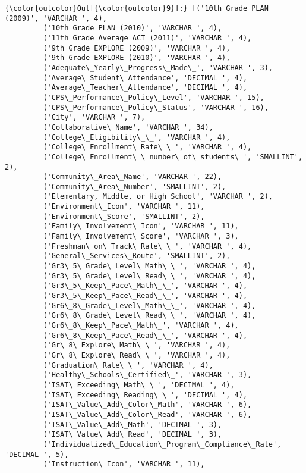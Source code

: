 \documentclass[11pt]{article}
\begin{document}
\begin{Verbatim}[commandchars=\\\{\}]
{\color{outcolor}Out[{\color{outcolor}9}]:} [('10th Grade PLAN (2009)', 'VARCHAR ', 4),
         ('10th Grade PLAN (2010)', 'VARCHAR ', 4),
         ('11th Grade Average ACT (2011)', 'VARCHAR ', 4),
         ('9th Grade EXPLORE (2009)', 'VARCHAR ', 4),
         ('9th Grade EXPLORE (2010)', 'VARCHAR ', 4),
         ('Adequate\_Yearly\_Progress\_Made\_', 'VARCHAR ', 3),
         ('Average\_Student\_Attendance', 'DECIMAL ', 4),
         ('Average\_Teacher\_Attendance', 'DECIMAL ', 4),
         ('CPS\_Performance\_Policy\_Level', 'VARCHAR ', 15),
         ('CPS\_Performance\_Policy\_Status', 'VARCHAR ', 16),
         ('City', 'VARCHAR ', 7),
         ('Collaborative\_Name', 'VARCHAR ', 34),
         ('College\_Eligibility\_\_', 'VARCHAR ', 4),
         ('College\_Enrollment\_Rate\_\_', 'VARCHAR ', 4),
         ('College\_Enrollment\_\_number\_of\_students\_', 'SMALLINT', 2),
         ('Community\_Area\_Name', 'VARCHAR ', 22),
         ('Community\_Area\_Number', 'SMALLINT', 2),
         ('Elementary, Middle, or High School', 'VARCHAR ', 2),
         ('Environment\_Icon', 'VARCHAR ', 11),
         ('Environment\_Score', 'SMALLINT', 2),
         ('Family\_Involvement\_Icon', 'VARCHAR ', 11),
         ('Family\_Involvement\_Score', 'VARCHAR ', 3),
         ('Freshman\_on\_Track\_Rate\_\_', 'VARCHAR ', 4),
         ('General\_Services\_Route', 'SMALLINT', 2),
         ('Gr3\_5\_Grade\_Level\_Math\_\_', 'VARCHAR ', 4),
         ('Gr3\_5\_Grade\_Level\_Read\_\_', 'VARCHAR ', 4),
         ('Gr3\_5\_Keep\_Pace\_Math\_\_', 'VARCHAR ', 4),
         ('Gr3\_5\_Keep\_Pace\_Read\_\_', 'VARCHAR ', 4),
         ('Gr6\_8\_Grade\_Level\_Math\_\_', 'VARCHAR ', 4),
         ('Gr6\_8\_Grade\_Level\_Read\_\_', 'VARCHAR ', 4),
         ('Gr6\_8\_Keep\_Pace\_Math\_', 'VARCHAR ', 4),
         ('Gr6\_8\_Keep\_Pace\_Read\_\_', 'VARCHAR ', 4),
         ('Gr\_8\_Explore\_Math\_\_', 'VARCHAR ', 4),
         ('Gr\_8\_Explore\_Read\_\_', 'VARCHAR ', 4),
         ('Graduation\_Rate\_\_', 'VARCHAR ', 4),
         ('Healthy\_Schools\_Certified\_', 'VARCHAR ', 3),
         ('ISAT\_Exceeding\_Math\_\_', 'DECIMAL ', 4),
         ('ISAT\_Exceeding\_Reading\_\_', 'DECIMAL ', 4),
         ('ISAT\_Value\_Add\_Color\_Math', 'VARCHAR ', 6),
         ('ISAT\_Value\_Add\_Color\_Read', 'VARCHAR ', 6),
         ('ISAT\_Value\_Add\_Math', 'DECIMAL ', 3),
         ('ISAT\_Value\_Add\_Read', 'DECIMAL ', 3),
         ('Individualized\_Education\_Program\_Compliance\_Rate', 'DECIMAL ', 5),
         ('Instruction\_Icon', 'VARCHAR ', 11),

\end{Verbatim}
\end{document}

